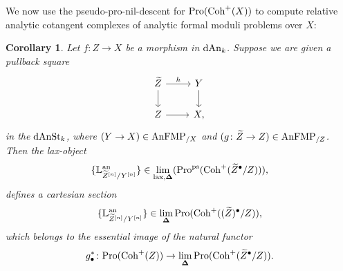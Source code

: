 \documentclass[10pt,a4paper,reqno]{amsart} %
\theoremstyle{plain}
\newtheorem{cor}[thm]{Corollary}
\theoremstyle{definition}
\theoremstyle{remark}
\numberwithin{equation}{section}
\begin{document}
We now use the pseudo-pro-nil-descent for $\mathrm{Pro}(\mathrm{Coh}^+(X))$ to compute relative analytic cotangent complexes of
analytic formal moduli problems over $X$:

\begin{cor} \label{cor:analytic_relative_cotangent_complex_defines_cartesian_sections_in_the_totalization}
    Let $f \colon Z \to X$ be a morphism in $\mathrm{dAn}_k$. Suppose we are given a pullback square
        \[
        \begin{tikzcd}
            \tZ \ar{r}{h} \ar{d} & Y \ar{d} \\
            Z \ar{r} & X,
        \end{tikzcd}
        \]
    in the \infcat $\mathrm{dAnSt}_k$, where $( Y \to X) \in \mathrm{AnFMP}_{/X}$ and $(g \colon\widetilde Z \to Z) \in \mathrm{AnFMP}_{/Z}$. Then the lax-object
        \[
            \{ \mathbb L^\mathrm{an}_{\widetilde Z^{[n]} / Y^{[n]}} \} \in \underset{\mathrm{lax}, \bm{\Delta}}{\lim}(\mathrm{Pro}^\mathrm{ps}(\mathrm{Coh}^+(\widetilde Z^\bullet/Z))),  
        \]
    defines a cartesian section
        \[
            \{ \mathbb L^\mathrm{an}_{\widetilde Z^{[n]}/ Y^{[n]}} \} \in \lim_{\bm{\Delta}}\mathrm{Pro}(\mathrm{Coh}^+((\widetilde Z)^\bullet /Z)),
        \]
    which belongs to the essential image of the natural functor
        \[
            g^*_\bullet \colon \mathrm{Pro}(\mathrm{Coh}^+(Z)) \to \lim_{\bm{\Delta}}\mathrm{Pro}(\mathrm{Coh}^+(\widetilde Z^\bullet / Z)).
        \]
\end{cor}
\end{document}
